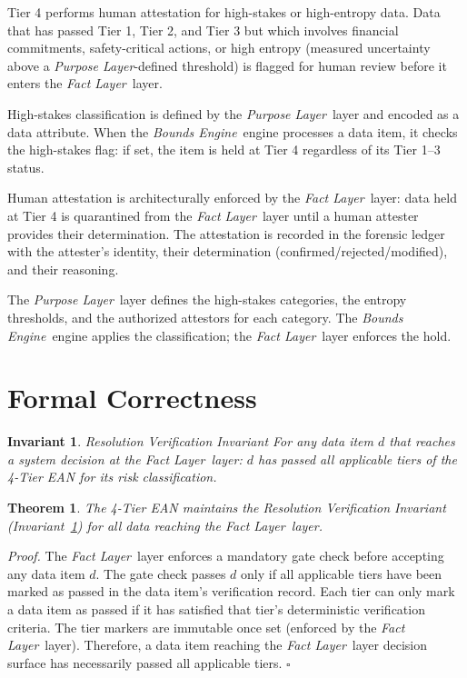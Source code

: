 \documentclass[12pt]{article}
\newcommand{\purpose}{\textit{Purpose Layer}}
\newcommand{\bounds}{\textit{Bounds Engine}}
\newcommand{\fact}{\textit{Fact Layer}}
\begin{document}
Tier 4 performs human attestation for high-stakes or high-entropy data. Data that has passed Tier 1, Tier 2, and Tier 3 but which involves financial commitments, safety-critical actions, or high entropy (measured uncertainty above a \purpose-defined threshold) is flagged for human review before it enters the \fact\ layer.

High-stakes classification is defined by the \purpose\ layer and encoded as a data attribute. When the \bounds\ engine processes a data item, it checks the high-stakes flag: if set, the item is held at Tier 4 regardless of its Tier 1--3 status.

Human attestation is architecturally enforced by the \fact\ layer: data held at Tier 4 is quarantined from the \fact\ layer until a human attester provides their determination. The attestation is recorded in the forensic ledger with the attester's identity, their determination (confirmed/rejected/modified), and their reasoning.

The \purpose\ layer defines the high-stakes categories, the entropy thresholds, and the authorized attestors for each category. The \bounds\ engine applies the classification; the \fact\ layer enforces the hold.

\section{Formal Correctness}
\label{sec:correctness}

\newtheorem{ean-thm}{Theorem}
\newtheorem{ean-invar}{Invariant}

\begin{ean-invar}{Resolution Verification Invariant}
\label{inv:resolution}
For any data item $d$ that reaches a system decision at the \fact\ layer: $d$ has passed all applicable tiers of the 4-Tier EAN for its risk classification.
\end{ean-invar}

\begin{ean-thm}
The 4-Tier EAN maintains the Resolution Verification Invariant (Invariant~\ref{inv:resolution}) for all data reaching the \fact\ layer.
\end{ean-thm}

\textit{Proof.} The \fact\ layer enforces a mandatory gate check before accepting any data item $d$. The gate check passes $d$ only if all applicable tiers have been marked as passed in the data item's verification record. Each tier can only mark a data item as passed if it has satisfied that tier's deterministic verification criteria. The tier markers are immutable once set (enforced by the \fact\ layer). Therefore, a data item reaching the \fact\ layer decision surface has necessarily passed all applicable tiers. $\square$
\end{document}
